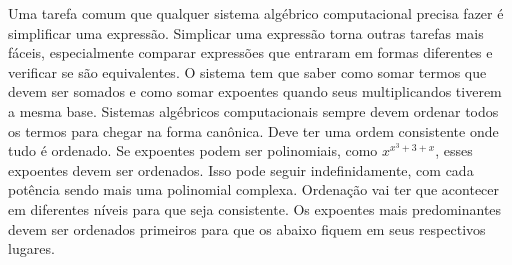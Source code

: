 \documentclass[a4]{article}
\begin{document}
		Uma tarefa comum que qualquer sistema algébrico computacional precisa
		fazer é simplificar uma expressão. Simplicar uma expressão torna outras
		tarefas mais fáceis, especialmente comparar expressões que entraram em
		formas diferentes e verificar se são equivalentes. O sistema tem que
		saber como somar termos que devem ser somados e como somar expoentes
		quando seus multiplicandos tiverem a mesma base. Sistemas algébricos
		computacionais sempre devem ordenar todos os termos para chegar na forma
		canônica. Deve ter uma ordem consistente onde tudo é ordenado. Se
		expoentes podem ser polinomiais, como $x^{x^3 +3+x}$, esses expoentes
		devem ser ordenados. Isso pode seguir indefinidamente, com cada potência
		sendo mais uma polinomial complexa. Ordenação vai ter que acontecer em
		diferentes níveis para que seja consistente. Os expoentes mais
		predominantes devem ser ordenados primeiros para que os abaixo fiquem em
		seus respectivos lugares.
\end{document}
